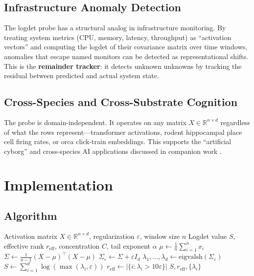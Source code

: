 \documentclass[12pt,a4paper]{article}
\begin{document}
\subsection{Infrastructure Anomaly Detection}

The logdet probe has a structural analog in infrastructure monitoring. By treating system metrics (CPU, memory, latency, throughput) as ``activation vectors'' and computing the logdet of their covariance matrix over time windows, anomalies that escape named monitors can be detected as representational shifts. This is the \textbf{remainder tracker}: it detects unknown unknowns by tracking the residual between predicted and actual system state.

\subsection{Cross-Species and Cross-Substrate Cognition}

The probe is domain-independent. It operates on any matrix $X \in \mathbb{R}^{n \times d}$ regardless of what the rows represent---transformer activations, rodent hippocampal place cell firing rates, or orca click-train embeddings. This supports the ``artificial cyborg'' and cross-species AI applications discussed in companion work \cite{summa}.

\section{Implementation}
\label{sec:implementation}

\subsection{Algorithm}

\begin{algorithm}[h]
\caption{LogDet Probe (per-layer, per-window)}
\begin{algorithmic}[1]
\Require Activation matrix $X \in \mathbb{R}^{n \times d}$, regularization $\varepsilon$, window size $n$
\Ensure Logdet value $S$, effective rank $r_\text{eff}$, concentration $C$, tail exponent $\alpha$
\State $\mu \gets \frac{1}{n}\sum_{i=1}^n x_i$
\State $\Sigma \gets \frac{1}{n-1}(X - \mu)^\top (X - \mu)$
\State $\Sigma_\varepsilon \gets \Sigma + \varepsilon I_d$
\State $\lambda_1, \dots, \lambda_d \gets \text{eigvalsh}(\Sigma_\varepsilon)$ 
\State $S \gets \sum_{i=1}^d \log(\max(\lambda_i, \varepsilon))$
\State $r_\text{eff} \gets |\{i : \lambda_i > 10\varepsilon\}|$
\State \Return $S, r_\text{eff}, \{\lambda_i\}$
\end{algorithmic}
\end{algorithm}
\end{document}
